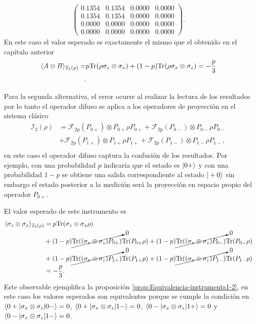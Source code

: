 \[\begin{split}
\begin{pmatrix}
        0.1354 &  0.1354 &  0.0000 &  0.0000\\
        0.1354 &  0.1354 &  0.0000 &  0.0000\\
        0.0000 &  0.0000 &  0.0000 &  0.0000\\
        0.0000 &  0.0000 &  0.0000 &  0.0000
      \end{pmatrix}.
    \end{split} \] En este caso el valor esperado es exactamente el mismo que el obtenido en el capítulo anterior\[\begin{split}\langle A\otimes B\rangle_{\mathcal{I}_1(\rho)}=&p{\rm Tr}(\rho\sigma_z\otimes \sigma_x )+(1-p){\rm Tr}(\rho\sigma_x\otimes \sigma_z )=-\frac{p}{3}\\.
    \end{split}\] 




Para la segunda alternativa, el error ocurre al realizar la lectura de los resultados por lo tanto el operador difuso se aplica a los operadores de proyección en el sistema clásico \[\begin{split}\mathcal{I}_2(\rho)&=\mathcal{F}_{2\text{p}}(P_{0+})\otimes P_{0+}\rho P_{0+}+\mathcal{F}_{2\text{p}}(P_{0-})\otimes P_{0-}\rho P_{0-}\\
    &+ \mathcal{F}_{2\text{p}}({P_{1+}})\otimes P_{1+}\rho P_{1+}+\mathcal{F}_{2\text{p}}(P_{1-})\otimes P_{1-}\rho P_{1-}, \\\end{split}\] en este caso el operador difuso captura la confusión de los resultados. Por ejemplo, con una probabilidad $p$ indicaría que el estado es $|0+\rangle$ y con una probabilidad $1-p$ se obtiene una salida correspondiente al estado $|+0\rangle$ sin embargo el estado posterior a la medición será la proyección en espacio propio del operador $P_{0+}$. 
    
    El valor esperado de este instrumento es \[\begin{split}
        \langle \sigma_z\otimes \sigma_x \rangle_{\mathcal{I}_2(\rho)}&=p{\rm Tr}(\sigma_z\otimes \sigma_x\rho)\\
        &+{(1-p)\cancelto{0}{{\rm Tr}( (\sigma_x\otimes \sigma_z)P_{0+})}}{\rm Tr}(P_{0+} \rho)+(1-p)\cancelto{0}{{\rm Tr}( (\sigma_x\otimes \sigma_z)P_{0-})}{\rm Tr}(P_{0-} \rho)\\
        &+(1-p)\cancelto{0}{{\rm Tr}( (\sigma_x\otimes \sigma_z)P_{1+})}{\rm Tr}(P_{1+} \rho)+(1-p)\cancelto{0}{{\rm Tr}( (\sigma_x\otimes \sigma_z)P_{1-})}{\rm Tr}(P_{1-} \rho)\\
        &=-\dfrac{p}{3}.
    \end{split}\] Este observable ejemplifica la proposición {\ref{prop:Equivalencia-instruments1-2}}, en este caso los valores esperados son equivalentes porque se cumple la condición en $\langle 0+|\sigma_x\otimes \sigma_z|0-\rangle=0$, $\langle 0+|\sigma_x\otimes \sigma_z|1-\rangle=0$, $\langle 0-|\sigma_x\otimes \sigma_z|1+\rangle=0$ y $\langle 0-|\sigma_x\otimes \sigma_z|1-\rangle=0$. 

